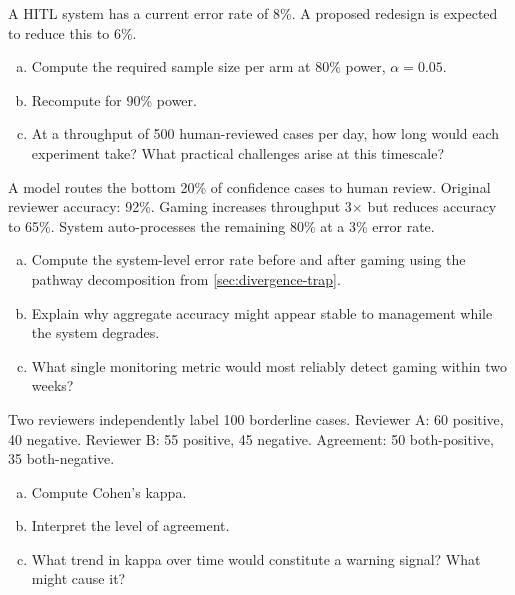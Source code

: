 \begin{Exercise}
A HITL system has a current error rate of 8\%. A proposed redesign is expected to reduce this to 6\%.
\begin{enumerate}[(a)]
    \item Compute the required sample size per arm at 80\% power, $\alpha = 0.05$.
    \item Recompute for 90\% power.
    \item At a throughput of 500 human-reviewed cases per day, how long would each experiment take? What practical challenges arise at this timescale?
\end{enumerate}
\end{Exercise}

\begin{Exercise}
A model routes the bottom 20\% of confidence cases to human review. Original reviewer accuracy: 92\%. Gaming increases throughput 3$\times$ but reduces accuracy to 65\%. System auto-processes the remaining 80\% at a 3\% error rate.
\begin{enumerate}[(a)]
    \item Compute the system-level error rate before and after gaming using the pathway decomposition from \cref{sec:divergence-trap}.
    \item Explain why aggregate accuracy might appear stable to management while the system degrades.
    \item What single monitoring metric would most reliably detect gaming within two weeks?
\end{enumerate}
\end{Exercise}

\begin{Exercise}
Two reviewers independently label 100 borderline cases. Reviewer A: 60 positive, 40 negative. Reviewer B: 55 positive, 45 negative. Agreement: 50 both-positive, 35 both-negative.
\begin{enumerate}[(a)]
    \item Compute Cohen's kappa.
    \item Interpret the level of agreement.
    \item What trend in kappa over time would constitute a warning signal? What might cause it?
\end{enumerate}
\end{Exercise}

